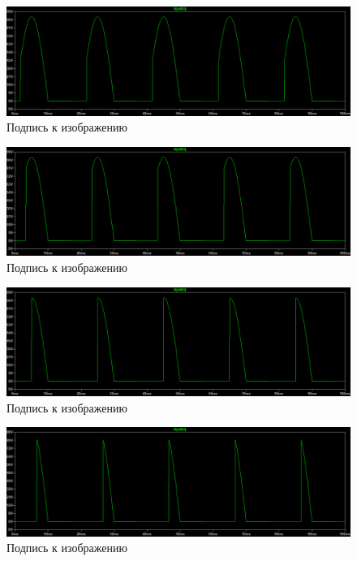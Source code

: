 \documentclass[a4paper, 12pt]{article}
\begin{document}
    \begin{figure}[H]
        \centering
        \includegraphics[scale=0.45]{a30_U27.563V.png}
        \captionsetup{skip=0pt}
        \caption{Подпись к изображению}
        \label{fig:a30_U27.563V}
    \end{figure}
    \begin{figure}[H]
        \centering
        \includegraphics[scale=0.45]{a60_U22.152V.png}
        \captionsetup{skip=0pt}
        \caption{Подпись к изображению}
        \label{fig:a60_U22.152V}
    \end{figure}
    \begin{figure}[H]
        \centering
        \includegraphics[scale=0.45]{a90_U14.74V.png}
        \captionsetup{skip=0pt}
        \caption{Подпись к изображению}
        \label{fig:a90_U14.74V}
    \end{figure}
    \begin{figure}[H]
        \centering
        \includegraphics[scale=0.45]{a120_U7.3324V.png}
        \captionsetup{skip=0pt}
        \caption{Подпись к изображению}
        \label{fig:a120_U7.3324V}
    \end{figure}
\end{document}
